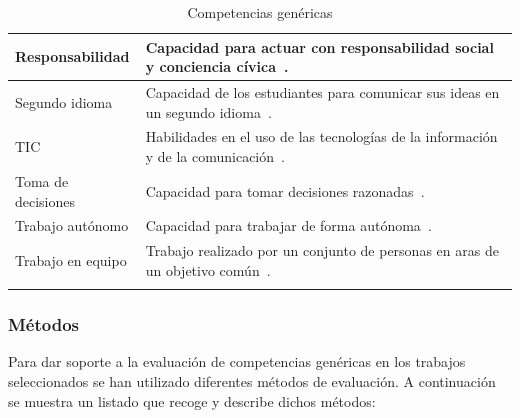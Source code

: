 \begin{landscape}
\begin{center}
\begin{longtable}{| m{6cm} | m{16cm} |}
    \hline
    Responsabilidad & Capacidad para actuar con responsabilidad social y conciencia cívica~\cite{gonzalez2003tuning}. \\
    \hline 
    Segundo idioma & Capacidad de los estudiantes para comunicar sus ideas en un segundo idioma~\cite{gass2013second}. \\
    \hline
    TIC & Habilidades en el uso de las tecnologías de la información y de la comunicación~\cite{gonzalez2003tuning}. \\
    \hline
    Toma de decisiones & Capacidad para tomar decisiones razonadas~\cite{gonzalez2003tuning}. \\
    \hline
    Trabajo autónomo & Capacidad para trabajar de forma autónoma~\cite{gonzalez2003tuning}. \\
    \hline
    Trabajo en equipo & Trabajo realizado por un conjunto de personas en aras de un objetivo común~\cite{parker1990teamwork}. \\
    \hline
\caption{Competencias genéricas}
\label{tab:CompetenciasGenericas}
\end{longtable} 
\end{center}
\end{landscape}
\pagestyle{fancy}

\subsubsection{Métodos}

Para dar soporte a la evaluación de competencias genéricas en los trabajos seleccionados se han utilizado diferentes métodos de evaluación. A continuación se muestra un listado que recoge y describe dichos métodos:

